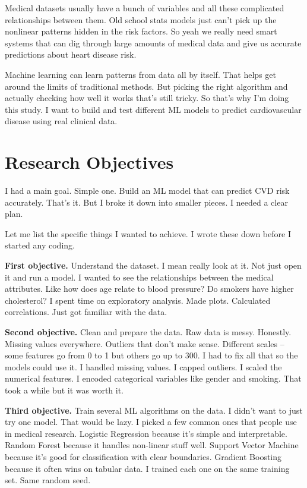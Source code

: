 \documentclass[11pt, a4paper, oneside]{book}
\begin{document}
Medical datasets usually have a bunch of variables and all these complicated relationships between them. Old school stats models just can't pick up the nonlinear patterns hidden in the risk factors. So yeah we really need smart systems that can dig through large amounts of medical data and give us accurate predictions about heart disease risk.

Machine learning can learn patterns from data all by itself. That helps get around the limits of traditional methods. But picking the right algorithm and actually checking how well it works that's still tricky. So that's why I'm doing this study. I want to build and test different ML models to predict cardiovascular disease using real clinical data.

\section{Research Objectives}

I had a main goal. Simple one. Build an ML model that can predict CVD risk accurately. That's it. But I broke it down into smaller pieces. I needed a clear plan.

Let me list the specific things I wanted to achieve. I wrote these down before I started any coding.

\textbf{First objective.} Understand the dataset. I mean really look at it. Not just open it and run a model. I wanted to see the relationships between the medical attributes. Like how does age relate to blood pressure? Do smokers have higher cholesterol? I spent time on exploratory analysis. Made plots. Calculated correlations. Just got familiar with the data.

\textbf{Second objective.} Clean and prepare the data. Raw data is messy. Honestly. Missing values everywhere. Outliers that don't make sense. Different scales – some features go from 0 to 1 but others go up to 300. I had to fix all that so the models could use it. I handled missing values. I capped outliers. I scaled the numerical features. I encoded categorical variables like gender and smoking. That took a while but it was worth it.

\textbf{Third objective.} Train several ML algorithms on the data. I didn't want to just try one model. That would be lazy. I picked a few common ones that people use in medical research. Logistic Regression because it's simple and interpretable. Random Forest because it handles non-linear stuff well. Support Vector Machine because it's good for classification with clear boundaries. Gradient Boosting because it often wins on tabular data. I trained each one on the same training set. Same random seed.
\end{document}
